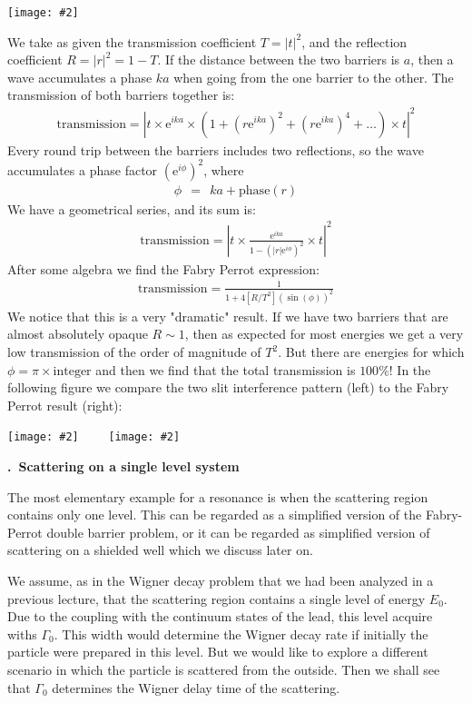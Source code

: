 \documentclass[onecolumn,fleqn, 11pt]{revtex4}
\newcommand{\eexp}{\mathrm{e}^}
\newcommand{\putgraph}[2][0.30\hsize]{\texttt{[image: \#2]}}
\newcommand{\putgraphr}[2][0.30\hsize]{\texttt{[image: \#2]}}
\newcommand{\beq}{\begin{eqnarray}}
\newcommand{\eeq}{\end{eqnarray}}
\renewcommand{\thesubsection}{\arabic{subsection}}
\renewcommand{\thesubsubsection}{\arabic{subsubsection}}
\newcommand{\sheadC}[1]
{
\addtocounter{subsubsection}{1}
\vspace{5mm}
{\bf \thesubsection.\thesubsubsection \ #1}  
\nopagebreak
\phantomsection
}
\begin{document}
\begin{center}
\putgraph[0.4\hsize]{FabryPerrot} 
\end{center}

We take as given the transmission coefficient ${T=|t|^2}$, 
and the reflection coefficient ${ R=|r|^2=1-T }$. 
If the distance between the two barriers is ${a}$,  
then a wave accumulates a phase ${ka}$ 
when going from the one barrier to the other. 
The transmission of both barriers together is:
\beq
\mbox{transmission}= | t \times \eexp{ika} \times (1+(r\eexp{ika})^2 + (r\eexp{ika})^4 +  \dots  ) \times t |^2 
\eeq
Every round trip between the barriers includes two reflections, 
so the wave accumulates a phase factor ${(\eexp{i\phi})^2}$, where
\beq
\phi \ \ = \ \ ka + \text{phase}(r)
\eeq
We have a geometrical series, and its sum is:
\beq
\mbox{transmission}= \left|t \times \frac{\eexp{ika}} { 1 - \left( |r| \eexp{i\phi} \right)^2 } \times t \right|^2 
\eeq
After some algebra we find the Fabry Perrot expression:
\beq
\mbox{transmission}= \frac{1}{1+4[R/T^2](\sin(\phi))^2} 
\eeq
We notice that this is a very "dramatic" result. 
If we have two barriers that are almost absolutely opaque ${R\sim1}$, 
then as expected for most energies we get a very low transmission 
of the order of magnitude of ${T^2}$. But there are energies 
for which ${\phi=\pi \times \mbox{integer}}$ and then we find 
that the total transmission is $100\%$!
In the following figure we compare the two slit 
interference pattern (left) to the Fabry Perrot result (right):


\begin{center}
\putgraph[0.3\hsize]{IntensityInterferencePattern}
\ \ \ \ 
\putgraphr[0.3\hsize]{FabryPerrotTransmission} 
\end{center}






\sheadC{Scattering on a single level system}

The most elementary example for a resonance is when 
the scattering region contains only one level. 
This can be regarded as a simplified version of 
the Fabry-Perrot double barrier problem, 
or it can be regarded as simplified version of 
scattering on a shielded well which we discuss 
later on. 
  
   
We assume, as in the Wigner decay problem that we had been analyzed 
in a previous lecture, that the scattering region contains 
a single level of energy $E_0$. Due to the coupling 
with the continuum states of the lead, 
this level acquire withs $\Gamma_0$. This width would 
determine the Wigner decay rate if initially the particle 
were prepared in this level. But we would like to 
explore a different scenario in which the particle 
is scattered from the outside. Then we shall see 
that $\Gamma_0$ determines the Wigner delay time of the scattering.     
  
\end{document}
